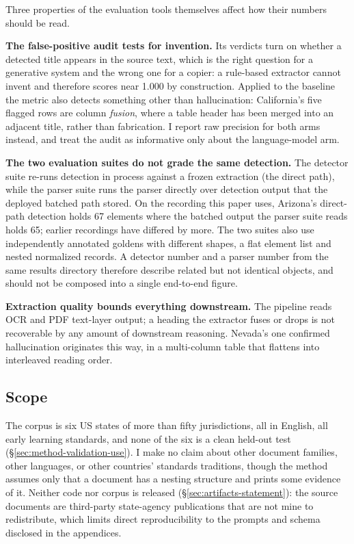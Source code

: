 Three properties of the evaluation tools themselves affect how their numbers
should be read.

\textbf{The false-positive audit tests for invention.} Its verdicts turn on
whether a detected title appears in the source text, which is the right question
for a generative system and the wrong one for a copier: a rule-based
extractor cannot invent and therefore scores near 1.000 by construction. Applied
to the baseline the metric also detects something other than hallucination:
California's five flagged rows are column \emph{fusion}, where a table header
has been merged into an adjacent title, rather than fabrication. I report raw
precision for both arms instead, and treat the audit as informative only about
the language-model arm.

\textbf{The two evaluation suites do not grade the same detection.} The detector
suite re-runs detection in process against a frozen extraction (the direct
path), while the parser suite runs the parser directly over detection output
that the deployed batched path stored. On the recording this paper uses, Arizona's direct-path detection holds
67 elements where the batched output the parser suite reads holds 65; earlier
recordings have differed by more. The two suites also use
independently annotated goldens with different shapes, a flat element list and
nested normalized records. A detector number and a parser number from the same
results directory therefore describe related but not identical objects, and
should not be composed into a single end-to-end figure.

\textbf{Extraction quality bounds everything downstream.} The pipeline reads OCR
and PDF text-layer output; a heading the extractor fuses or drops is not
recoverable by any amount of downstream reasoning. Nevada's one confirmed
hallucination originates this way, in a multi-column table that flattens into
interleaved reading order.

\subsection{Scope}

The corpus is six US states of more than fifty jurisdictions, all in English,
all early learning standards, and none of the six is a clean held-out test
(\S\ref{sec:method-validation-use}). I make no claim about other document families,
other languages, or other countries' standards traditions, though the method
assumes only that a document has a nesting structure and prints some evidence
of it. Neither code nor corpus is released (\S\ref{sec:artifacts-statement}):
the source documents are third-party state-agency publications that are not mine
to redistribute, which limits direct reproducibility to the prompts and schema
disclosed in the appendices.
